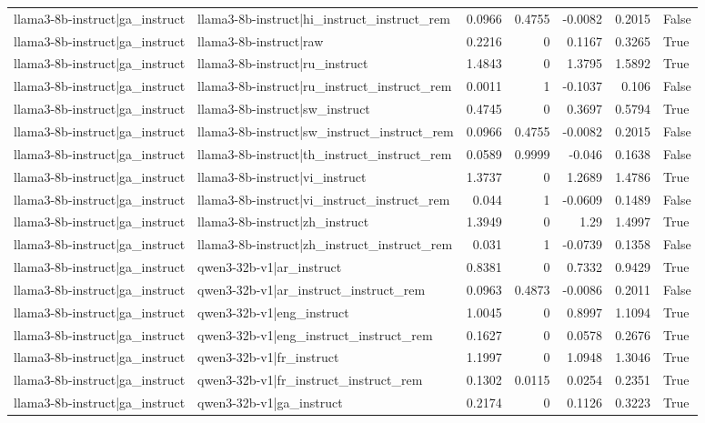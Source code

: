 \begin{table}
\begin{tabular}{l l r r r r l}
llama3-8b-instruct|ga_instruct & llama3-8b-instruct|hi_instruct_instruct_rem & 0.0966 & 0.4755 & -0.0082 & 0.2015 & False \\
llama3-8b-instruct|ga_instruct & llama3-8b-instruct|raw & 0.2216 & 0 & 0.1167 & 0.3265 & True \\
llama3-8b-instruct|ga_instruct & llama3-8b-instruct|ru_instruct & 1.4843 & 0 & 1.3795 & 1.5892 & True \\
llama3-8b-instruct|ga_instruct & llama3-8b-instruct|ru_instruct_instruct_rem & 0.0011 & 1 & -0.1037 & 0.106 & False \\
llama3-8b-instruct|ga_instruct & llama3-8b-instruct|sw_instruct & 0.4745 & 0 & 0.3697 & 0.5794 & True \\
llama3-8b-instruct|ga_instruct & llama3-8b-instruct|sw_instruct_instruct_rem & 0.0966 & 0.4755 & -0.0082 & 0.2015 & False \\
llama3-8b-instruct|ga_instruct & llama3-8b-instruct|th_instruct_instruct_rem & 0.0589 & 0.9999 & -0.046 & 0.1638 & False \\
llama3-8b-instruct|ga_instruct & llama3-8b-instruct|vi_instruct & 1.3737 & 0 & 1.2689 & 1.4786 & True \\
llama3-8b-instruct|ga_instruct & llama3-8b-instruct|vi_instruct_instruct_rem & 0.044 & 1 & -0.0609 & 0.1489 & False \\
llama3-8b-instruct|ga_instruct & llama3-8b-instruct|zh_instruct & 1.3949 & 0 & 1.29 & 1.4997 & True \\
llama3-8b-instruct|ga_instruct & llama3-8b-instruct|zh_instruct_instruct_rem & 0.031 & 1 & -0.0739 & 0.1358 & False \\
llama3-8b-instruct|ga_instruct & qwen3-32b-v1|ar_instruct & 0.8381 & 0 & 0.7332 & 0.9429 & True \\
llama3-8b-instruct|ga_instruct & qwen3-32b-v1|ar_instruct_instruct_rem & 0.0963 & 0.4873 & -0.0086 & 0.2011 & False \\
llama3-8b-instruct|ga_instruct & qwen3-32b-v1|eng_instruct & 1.0045 & 0 & 0.8997 & 1.1094 & True \\
llama3-8b-instruct|ga_instruct & qwen3-32b-v1|eng_instruct_instruct_rem & 0.1627 & 0 & 0.0578 & 0.2676 & True \\
llama3-8b-instruct|ga_instruct & qwen3-32b-v1|fr_instruct & 1.1997 & 0 & 1.0948 & 1.3046 & True \\
llama3-8b-instruct|ga_instruct & qwen3-32b-v1|fr_instruct_instruct_rem & 0.1302 & 0.0115 & 0.0254 & 0.2351 & True \\
llama3-8b-instruct|ga_instruct & qwen3-32b-v1|ga_instruct & 0.2174 & 0 & 0.1126 & 0.3223 & True \\

\end{tabular}
\end{table}
